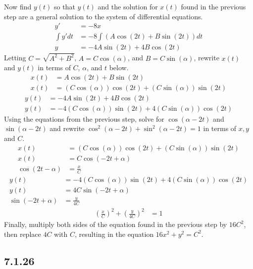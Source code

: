 \documentclass{article}
\begin{document}
\begin{enumerate}[label = \textbf{(\alph*)}]
		Now find $ y(t) $ so that $ y(t) $ and the solution for $ x(t) $ found in the previous step are a general solution to the system of differential equations.
		\begin{align*}
			y' & = -8x \\
			\int y' dt & = -8 \int \left( A\cos(2t) + B\sin(2t) \right) dt \\
			y & = -4A\sin(2t) + 4B\cos(2t)
		\end{align*}
		Letting $ C = \sqrt{A^2 + B^2} $, $ A = C\cos(\alpha) $, and $ B = C\sin(\alpha) $, rewrite $ x(t) $ and $ y(t) $ in terms of $ C $, $ \alpha $, and $ t $ below.
		\begin{align*}
			x(t) & = A\cos(2t) + B\sin(2t) \\
			x(t) & = (C\cos(\alpha))\cos(2t) + (C\sin(\alpha))\sin(2t)
		\end{align*}
		\begin{align*}
			y(t) & = -4A\sin(2t) + 4B\cos(2t) \\
			y(t) & = -4(C\cos(\alpha))\sin(2t) + 4(C\sin(\alpha))\cos(2t)
		\end{align*}
		Using the equations from the previous step, solve for $ \cos(\alpha - 2t) $ and $ \sin(\alpha - 2t) $ and rewrite $ \cos^2(\alpha - 2t) + \sin^2(\alpha - 2t) = 1 $ in terms of $ x, y $ and $ C $.
		\begin{align*}
			x(t) & = (C\cos(\alpha))\cos(2t) + (C\sin(\alpha))\sin(2t) \\
			x(t) & = C\cos(-2t + \alpha) \\
			\cos(2t - \alpha) & = \frac{x}{C}
		\end{align*}
		\begin{align*}
			y(t) & = -4(C\cos(\alpha))\sin(2t) + 4(C\sin(\alpha))\cos(2t) \\
			y(t) & = 4C\sin(-2t + \alpha) \\
			\sin(-2t + \alpha) & = \frac{y}{4C}
		\end{align*}
		\begin{align*}
			\left( \frac{x}{C} \right)^2 + \left( \frac{y}{4C} \right)^2 & = 1
		\end{align*}
		Finally, multiply both sides of the equation found in the previous step by $ 16C^2 $, then replace $ 4C $ with $ C $, resulting in the equation $ 16x^2 + y^2 = C^2 $.
\end{enumerate}

\subsection{7.1.26}
\end{document}
